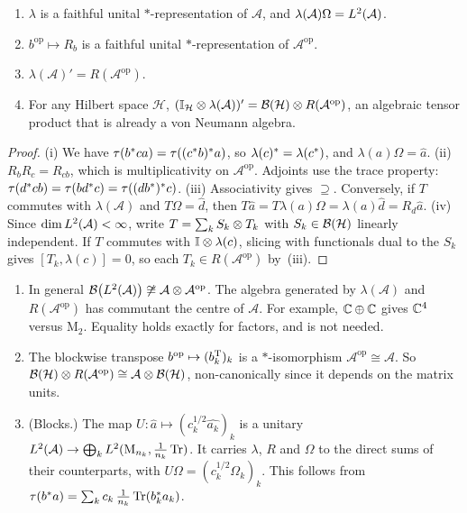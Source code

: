 \documentclass[12pt]{article}
\newcommand{\alg}{\mathcal{A}}             %
\newcommand{\hilb}{\mathcal{H}}            %
\newcommand{\bdd}[1]{\mathcal{B}\br{#1}}   %
\newcommand{\Mn}[1]{\mathrm{M}_{#1}}       %
\newcommand{\op}{^{\mathrm{op}}}           %
\newcommand{\Ltwo}{L^2\br{\alg}}
\newcommand{\vect}[1]{\widehat{#1}}
\begin{document}
\begin{lemma}
\label{lem:standard}
\begin{enumerate}[label=(\roman*)]
  \item \(\lambda\) is a faithful unital \(*\)-representation of \(\alg\), and
    \(\lambda(\alg)\Omega = \Ltwo\).
  \item \(b\op \mapsto R_b\) is a faithful unital \(*\)-representation of
    \(\alg\op\).
  \item \(\lambda(\alg)' = R(\alg\op)\).
  \item For any Hilbert space \(\hilb\),
    \((\id_{\hilb} \tensor \lambda(\alg))' = \bdd{\hilb} \tensor R(\alg\op)\), an
    algebraic tensor product that is already a von Neumann algebra.
\end{enumerate}
\end{lemma}
\begin{proof}
(i) We have \(\tau(b^* ca) = \tau((c^* b)^* a)\), so
\(\lambda(c)^* = \lambda(c^*)\), and \(\lambda(a)\Omega = \vect a\).
(ii) \(R_bR_c = R_{cb}\), which is multiplicativity on \(\alg\op\). Adjoints use
the trace property:
\(\tau(d^* cb) = \tau(bd^* c) = \tau((db^*)^* c)\).
(iii) Associativity gives \(\supseteq\). Conversely, if \(T\) commutes with
\(\lambda(\alg)\) and \(T\Omega = \vect d\), then
\(T\vect a = T\lambda(a)\Omega = \lambda(a)\vect d = R_d\vect a\).
(iv) Since \(\dim\Ltwo < \infty\), write \(T = \sum_k S_k \otimes T_k\) with
\(S_k \in \bdd\hilb\) linearly independent. If \(T\) commutes with
\({\mathbb I} \otimes \lambda(c)\), slicing with functionals dual to the \(S_k\) gives
\([T_k, \lambda(c)] = 0\), so each \(T_k \in R(\alg\op)\) by~(iii).
\end{proof}

\begin{remark}
\label{rem:op}
\begin{enumerate}[label=(\alph*)]
  \item In general \(\bdd{\Ltwo} \not\cong \alg \tensor \alg\op\). The algebra
    generated by \(\lambda(\alg)\) and \(R(\alg\op)\) has commutant the centre of
    \(\alg\). For example, \({\mathbb C} \oplus {\mathbb C}\) gives \({\mathbb C}^4\)
    versus \(\Mn 2\). Equality holds exactly for factors, and is not needed.
  \item The blockwise transpose \(b\op \mapsto (b_k^\transpose)_k\) is a
    \(*\)-isomorphism \(\alg\op \cong \alg\). So
    \(\bdd\hilb \tensor R(\alg\op) \cong \alg \tensor \bdd\hilb\), non-canonically
    since it depends on the matrix units.
  \item (Blocks.) The map
    \(U : \vect a \mapsto (c_k^{1/2}\vect{a_k})_k\) is a unitary
    \(\Ltwo \to \bigoplus_k L^2(\Mn{n_k}, \frac{1}{n_k}\trace)\). It carries
    \(\lambda\), \(R\) and \(\Omega\) to the direct sums of their counterparts, with
    \(U\Omega = (c_k^{1/2}\Omega_k)_k\). This follows from
    \(\tau(b^* a) = \sum_k c_k\,\frac{1}{n_k}\operatorname{Tr}(b_k^* a_k)\).
\end{enumerate}
\end{remark}
\end{document}
